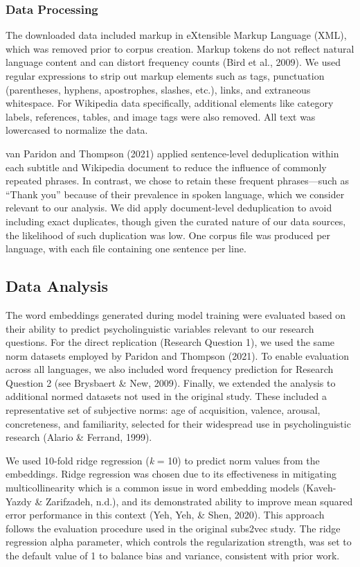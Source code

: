 \documentclass[
  man,floatsintext]{apa6}
\begin{document}
\subsubsection{Data Processing}\label{data-processing}

The downloaded data included markup in eXtensible Markup Language (XML), which was removed prior to corpus creation. Markup tokens do not reflect natural language content and can distort frequency counts (Bird et al., 2009). We used regular expressions to strip out markup elements such as tags, punctuation (parentheses, hyphens, apostrophes, slashes, etc.), links, and extraneous whitespace. For Wikipedia data specifically, additional elements like category labels, references, tables, and image tags were also removed. All text was lowercased to normalize the data.

van Paridon and Thompson (2021) applied sentence-level deduplication within each subtitle and Wikipedia document to reduce the influence of commonly repeated phrases. In contrast, we chose to retain these frequent phrases---such as ``Thank you'' because of their prevalence in spoken language, which we consider relevant to our analysis. We did apply document-level deduplication to avoid including exact duplicates, though given the curated nature of our data sources, the likelihood of such duplication was low. One corpus file was produced per language, with each file containing one sentence per line.

\subsection{Data Analysis}\label{data-analysis}

The word embeddings generated during model training were evaluated based on their ability to predict psycholinguistic variables relevant to our research questions. For the direct replication (Research Question 1), we used the same norm datasets employed by Paridon and Thompson (2021). To enable evaluation across all languages, we also included word frequency prediction for Research Question 2 (see Brysbaert \& New, 2009). Finally, we extended the analysis to additional normed datasets not used in the original study. These included a representative set of subjective norms: age of acquisition, valence, arousal, concreteness, and familiarity, selected for their widespread use in psycholinguistic research (Alario \& Ferrand, 1999).

We used 10-fold ridge regression (\emph{k} = 10) to predict norm values from the embeddings. Ridge regression was chosen due to its effectiveness in mitigating multicollinearity which is a common issue in word embedding models (Kaveh-Yazdy \& Zarifzadeh, n.d.), and its demonstrated ability to improve mean squared error performance in this context (Yeh, Yeh, \& Shen, 2020). This approach follows the evaluation procedure used in the original subs2vec study. The ridge regression alpha parameter, which controls the regularization strength, was set to the default value of 1 to balance bias and variance, consistent with prior work.
\end{document}
